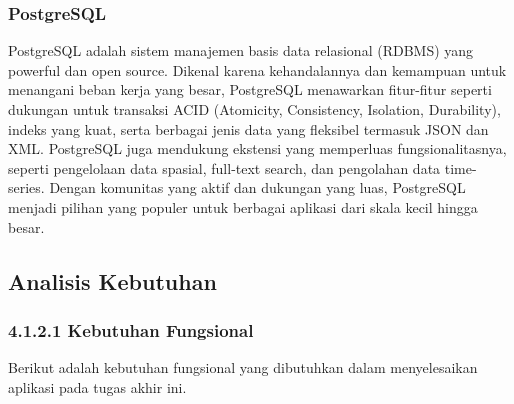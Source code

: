   \subsubsection{PostgreSQL}
  PostgreSQL adalah sistem manajemen basis data relasional (RDBMS) yang powerful dan open source. Dikenal karena kehandalannya dan kemampuan untuk menangani beban kerja yang besar, PostgreSQL menawarkan fitur-fitur seperti dukungan untuk transaksi ACID (Atomicity, Consistency, Isolation, Durability), indeks yang kuat, serta berbagai jenis data yang fleksibel termasuk JSON dan XML. PostgreSQL juga mendukung ekstensi yang memperluas fungsionalitasnya, seperti pengelolaan data spasial, full-text search, dan pengolahan data time-series. Dengan komunitas yang aktif dan dukungan yang luas, PostgreSQL menjadi pilihan yang populer untuk berbagai aplikasi dari skala kecil hingga besar.

\subsection{Analisis Kebutuhan}

\subsubsection{4.1.2.1 Kebutuhan Fungsional}
Berikut adalah kebutuhan fungsional yang dibutuhkan dalam menyelesaikan aplikasi pada tugas akhir ini.

